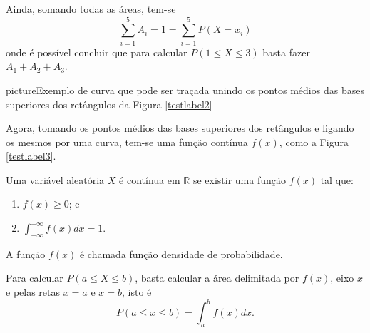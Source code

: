 Ainda, somando todas as áreas, tem-se
\[
	\sum_{i=1}^{5} A_i = 1 = \sum_{i=1}^{5} P(X=x_i)
\]
onde é possível concluir que para calcular $P(1\leqslant X \leqslant 3)$ basta fazer $A_1 + A_2 + A_3$.
\newpage

\begin{sidepicture}{0cm}{picture}{Exemplo de curva que pode ser traçada unindo os pontos médios das bases superiores dos retângulos da Figura \ref{testlabel2}}
	\label{testlabel3}
\end{sidepicture}

Agora, tomando os pontos médios das bases superiores dos retângulos e ligando os mesmos por uma curva, tem-se uma função contínua $f(x)$, como a Figura \ref{testlabel3}.

\begin{definition}
	Uma variável aleatória $X$ é contínua em $\mathbb{R}$ se existir uma função $f(x)$ tal que:
	\begin{enumerate}[label={\roman*)}]
		\item $f(x) \geqslant 0$; e
		\item $\displaystyle \int_{-\infty}^{+\infty} f(x)dx = 1$.
	\end{enumerate}
	
	A função $f(x)$ é chamada função densidade de probabilidade.
\end{definition}

\begin{remark}
	Para calcular $P(a\leqslant X \leqslant b)$, basta calcular a área delimitada por $f(x)$, eixo $x$ e pelas retas $x=a$ e $x=b$, isto é
	\begin{equation}
		P(a\leqslant x \leqslant b) = \int_{a}^{b} f(x)dx
		\text{.}
	\end{equation}
\end{remark}

